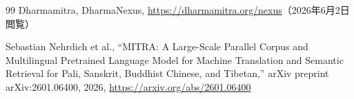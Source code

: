 \documentclass[uplatex,dvipdfmx,11pt,a4paper]{jsarticle}
\begin{document}
\begin{thebibliography}{99}
Dharmamitra,
\newblock DharmaNexus,
\newblock \url{https://dharmamitra.org/nexus}（2026年6月2日閲覧）

Sebastian Nehrdich et al.,
\newblock ``MITRA: A Large-Scale Parallel Corpus and Multilingual Pretrained Language Model for Machine Translation and Semantic Retrieval for Pali, Sanskrit, Buddhist Chinese, and Tibetan,''
\newblock arXiv preprint arXiv:2601.06400, 2026,
\newblock \url{https://arxiv.org/abs/2601.06400}

\end{thebibliography}
\end{document}
